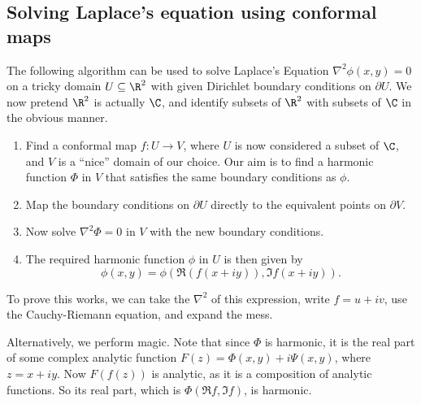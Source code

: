 \documentclass[a4paper]{article}
\begin{document}
\subsection{Solving Laplace's equation using conformal maps}
The following algorithm can be used to solve Laplace's Equation $\nabla^2 \phi(x, y) = 0$ on a tricky domain $U \subseteq \R^2$ with given Dirichlet boundary conditions on $\partial U$. We now pretend $\R^2$ is actually $\C$, and identify subsets of $\R^2$ with subsets of $\C$ in the obvious manner.
\begin{enumerate}
  \item Find a conformal map $f: U \to V$, where $U$ is now considered a subset of $\C$, and $V$ is a ``nice'' domain of our choice. Our aim is to find a harmonic function $\Phi$ in $V$ that satisfies the same boundary conditions as $\phi$.
  \item Map the boundary conditions on $\partial U$ directly to the equivalent points on $\partial V$.
  \item Now solve $\nabla^2 \Phi = 0$ in $V$ with the new boundary conditions.
  \item The required harmonic function $\phi$ in $U$ is then given by
    \[
      \phi(x, y) = \phi(\Re(f(x + iy)), \Im f(x + iy)).
    \]
\end{enumerate}
To prove this works, we can take the $\nabla^2$ of this expression, write $f = u + iv$, use the Cauchy-Riemann equation, and expand the mess.

Alternatively, we perform magic. Note that since $\Phi$ is harmonic, it is the real part of some complex analytic function $F(z) = \Phi(x, y) + i \Psi(x, y)$, where $z = x + iy$. Now $F(f(z))$ is analytic, as it is a composition of analytic functions. So its real part, which is $\Phi(\Re f, \Im f)$, is harmonic.
\end{document}

